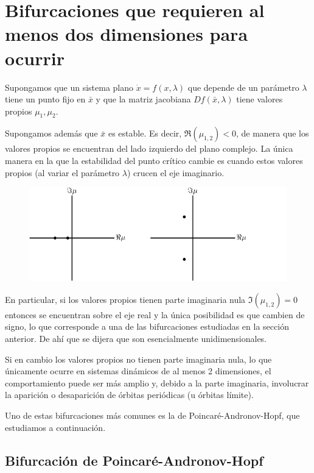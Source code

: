 \section{Bifurcaciones que requieren al menos dos dimensiones para ocurrir}

Supongamos que un sistema plano $\dot{x} = f(x, \lambda)$ que depende de un parámetro $\lambda$ tiene un punto fijo en $\bar{x}$ y que la matriz jacobiana $Df(\bar{x}, \lambda)$ tiene valores propios $\mu_1, \mu_2$.

Supongamos además que $\bar{x}$ es estable. Es decir, $\Re(\mu_{1,2}) < 0$, de manera que los valores propios se encuentran del lado izquierdo del plano complejo.
La única manera en la que la estabilidad del punto crítico cambie es cuando estos valores propios (al variar el parámetro $\lambda$) crucen el eje imaginario.

\begin{figure}[ht] \centering
    \includegraphics[scale=1.0]{figures/bifurcations-2dimensional.pdf}
\end{figure}

En particular, si los valores propios tienen parte imaginaria nula $\Im(\mu_{1,2}) = 0$ entonces se encuentran sobre el eje real y la única posibilidad es que cambien de signo, lo que corresponde a una de las bifurcaciones estudiadas en la sección anterior.
De ahí que se dijera que son esencialmente unidimensionales.

Si en cambio los valores propios no tienen parte imaginaria nula, lo que únicamente ocurre en sistemas dinámicos de al menos 2 dimensiones, el comportamiento puede ser más amplio y, debido a la parte imaginaria, involucrar la aparición o desaparición de órbitas periódicas (u órbitas límite).

Uno de estas bifurcaciones más comunes es la de Poincaré-Andronov-Hopf, que estudiamos a continuación.

\subsection{Bifurcación de Poincaré-Andronov-Hopf}

